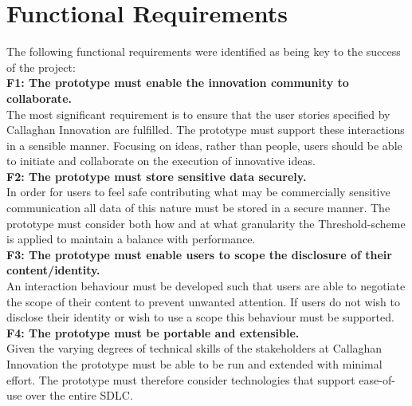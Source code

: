 \section{Functional Requirements}
The following functional requirements were identified as being key to the success of the project:
\newline
\\
\textbf{F1: The prototype must enable the innovation community to collaborate.}
\newline
\\
The most significant requirement is to ensure that the user stories specified by Callaghan Innovation are fulfilled. The prototype must support these interactions in a sensible manner. Focusing on ideas, rather than people, users should be able to initiate and collaborate on the execution of innovative ideas.
\newline
\\
\textbf{F2: The prototype must store sensitive data securely.}
\newline
\\
In order for users to feel safe contributing what may be commercially sensitive communication all data of this nature must be stored in a secure manner. The prototype must consider both how and at what granularity the Threshold-scheme is applied to maintain a balance with performance.
\newline
\\
\textbf{F3:  The prototype must enable users to scope the disclosure of their content/identity.}
\newline
\\
An interaction behaviour must be developed such that users are able to negotiate the scope of their content to prevent unwanted attention. If users do not wish to disclose their identity or wish to use a scope this behaviour must be supported.
\newline
\\
\textbf{F4:  The prototype must be portable and extensible.}
\newline
\\
Given the varying degrees of technical skills of the stakeholders at Callaghan Innovation the prototype must be able to be run and extended with minimal effort. The prototype must therefore consider technologies that support ease-of-use over the entire SDLC.

